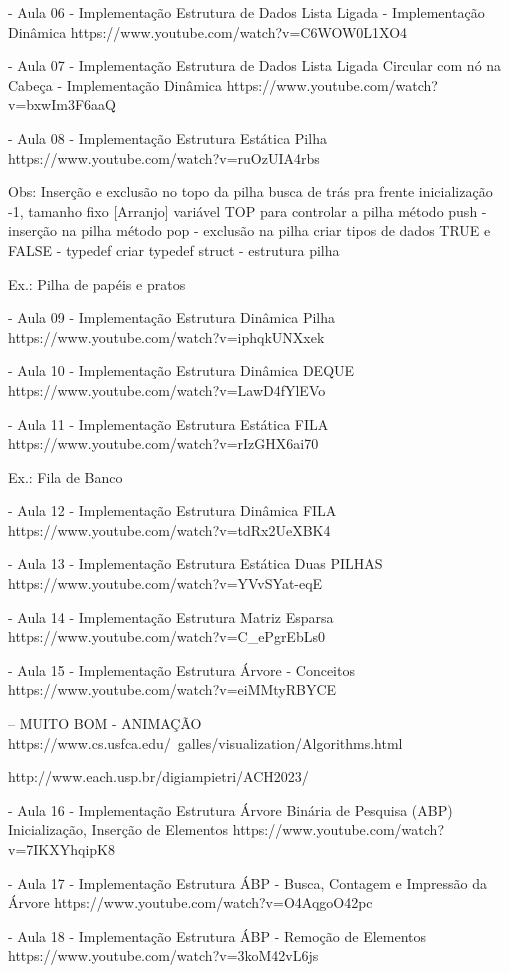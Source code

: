 \documentclass{article}
\begin{document}
- Aula 06 - Implementação Estrutura de Dados Lista Ligada - Implementação Dinâmica
https://www.youtube.com/watch?v=C6WOW0L1XO4

- Aula 07 - Implementação Estrutura de Dados Lista Ligada Circular com nó na Cabeça - Implementação Dinâmica
https://www.youtube.com/watch?v=bxwIm3F6aaQ

- Aula 08 - Implementação Estrutura Estática Pilha 
https://www.youtube.com/watch?v=ruOzUIA4rbs

Obs: Inserção e exclusão no topo da pilha
     busca de trás pra frente
     inicialização -1, tamanho fixo [Arranjo]
     variável TOP para controlar a pilha
     método push - inserção na pilha
     método pop - exclusão na pilha
     criar tipos de dados TRUE e FALSE - typedef
     criar typedef struct - estrutura pilha
     
     Ex.: Pilha de papéis e pratos

- Aula 09 - Implementação Estrutura Dinâmica Pilha 
https://www.youtube.com/watch?v=iphqkUNXxek

- Aula 10 - Implementação Estrutura Dinâmica DEQUE 
https://www.youtube.com/watch?v=LawD4fYlEVo

- Aula 11 - Implementação Estrutura Estática FILA 
https://www.youtube.com/watch?v=rIzGHX6ai70

Ex.: Fila de Banco

- Aula 12 - Implementação Estrutura Dinâmica FILA 
https://www.youtube.com/watch?v=tdRx2UeXBK4

- Aula 13 - Implementação Estrutura Estática Duas PILHAS 
https://www.youtube.com/watch?v=YVvSYat-eqE

- Aula 14 - Implementação Estrutura Matriz Esparsa 
https://www.youtube.com/watch?v=C_ePgrEbLs0

- Aula 15 - Implementação Estrutura Árvore - Conceitos 
https://www.youtube.com/watch?v=eiMMtyRBYCE

-- MUITO BOM - ANIMAÇÃO
https://www.cs.usfca.edu/~galles/visualization/Algorithms.html

http://www.each.usp.br/digiampietri/ACH2023/

- Aula 16 - Implementação Estrutura Árvore Binária de Pesquisa (ABP)
            Inicialização, Inserção de Elementos
https://www.youtube.com/watch?v=7IKXYhqipK8

- Aula 17 - Implementação Estrutura ÁBP - Busca, Contagem e Impressão da Árvore
https://www.youtube.com/watch?v=O4AqgoO42pc

- Aula 18 - Implementação Estrutura ÁBP - Remoção de Elementos
https://www.youtube.com/watch?v=3koM42vL6js
\end{document}
